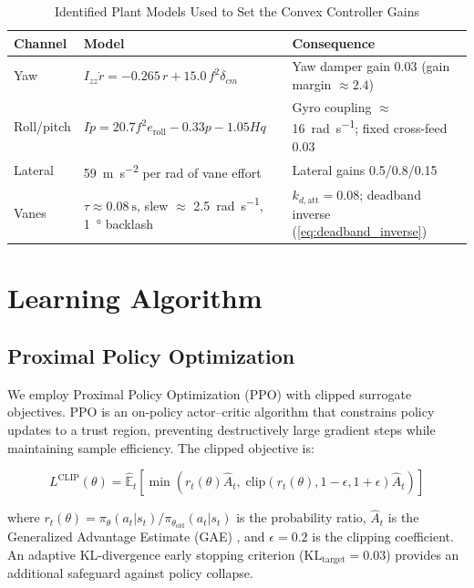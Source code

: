 \documentclass[conference]{IEEEtran}
\begin{document}
\begin{table}[htbp]
\caption{Identified Plant Models Used to Set the Convex Controller Gains}
\label{tab:sysid}
\centering
\footnotesize
\setlength{\tabcolsep}{3pt}
\begin{tabular}{>{\raggedright\arraybackslash}p{}>{\raggedright\arraybackslash}p{}>{\raggedright\arraybackslash}p{}}
\toprule
\textbf{Channel} & \textbf{Model} & \textbf{Consequence} \\
\midrule
Yaw & $I_{zz}\dot r = -0.265\,r + 15.0\,f^2\delta_{cm}$ & Yaw damper gain 0.03 (gain margin $\approx 2.4$) \\
Roll/pitch & $I\dot p = 20.7 f^2 e_{\text{roll}} - 0.33p - 1.05 H q$ & Gyro coupling $\approx$ \SI{16}{\radian\per\second}; fixed cross-feed 0.03 \\
Lateral & \SI{59}{\metre\per\second\squared} per rad of vane effort & Lateral gains 0.5/0.8/0.15 \\
Vanes & $\tau \approx \SI{0.08}{\second}$, slew $\approx$ \SI{2.5}{\radian\per\second}, \SI{1}{\degree} backlash & $k_{d,\text{att}} = 0.08$; deadband inverse (\ref{eq:deadband_inverse}) \\
\bottomrule
\end{tabular}
\end{table}


\section{Learning Algorithm}

\subsection{Proximal Policy Optimization}

We employ Proximal Policy Optimization (PPO) \cite{b14} with clipped surrogate objectives. PPO is an on-policy actor--critic algorithm that constrains policy updates to a trust region, preventing destructively large gradient steps while maintaining sample efficiency. The clipped objective is:

\begin{equation}
L^{\text{CLIP}}(\theta) = \hat{\mathbb{E}}_t \left[ \min\!\left( r_t(\theta) \hat{A}_t,\; \text{clip}(r_t(\theta), 1{-}\epsilon, 1{+}\epsilon) \hat{A}_t \right) \right]
\label{eq:ppo_clip}
\end{equation}

\noindent where $r_t(\theta) = \pi_\theta(a_t | s_t) / \pi_{\theta_{\text{old}}}(a_t | s_t)$ is the probability ratio, $\hat{A}_t$ is the Generalized Advantage Estimate (GAE) \cite{b15}, and $\epsilon = 0.2$ is the clipping coefficient. An adaptive KL-divergence early stopping criterion ($\text{KL}_{\text{target}} = 0.03$) provides an additional safeguard against policy collapse.
\end{document}
